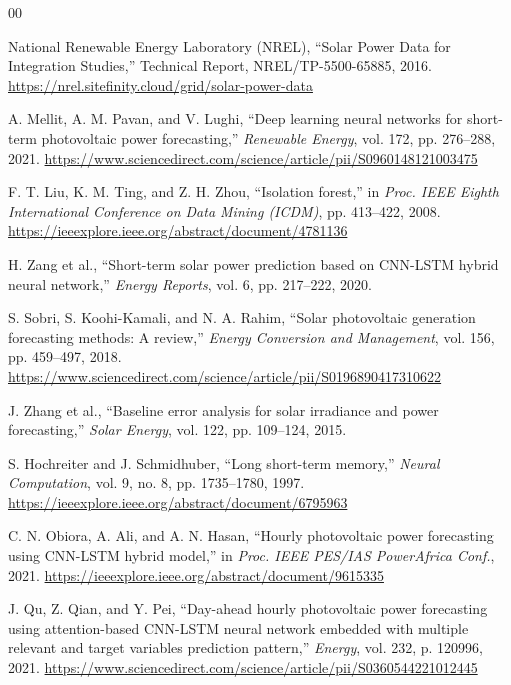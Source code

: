 \documentclass[conference]{IEEEtran}
\begin{document}
\begin{thebibliography}{00}

 National Renewable Energy Laboratory (NREL), ``Solar Power Data for Integration Studies,'' Technical Report, NREL/TP-5500-65885, 2016. \url{https://nrel.sitefinity.cloud/grid/solar-power-data}

 A. Mellit, A. M. Pavan, and V. Lughi, ``Deep learning neural networks for short-term photovoltaic power forecasting,'' \textit{Renewable Energy}, vol. 172, pp. 276--288, 2021. \url{https://www.sciencedirect.com/science/article/pii/S0960148121003475}

 F. T. Liu, K. M. Ting, and Z. H. Zhou, ``Isolation forest,'' in \textit{Proc. IEEE Eighth International Conference on Data Mining (ICDM)}, pp. 413--422, 2008. \url{https://ieeexplore.ieee.org/abstract/document/4781136}

 H. Zang et al., ``Short-term solar power prediction based on CNN-LSTM hybrid neural network,'' \textit{Energy Reports}, vol. 6, pp. 217--222, 2020.

 S. Sobri, S. Koohi-Kamali, and N. A. Rahim, ``Solar photovoltaic generation forecasting methods: A review,'' \textit{Energy Conversion and Management}, vol. 156, pp. 459--497, 2018. \url{https://www.sciencedirect.com/science/article/pii/S0196890417310622}

 J. Zhang et al., ``Baseline error analysis for solar irradiance and power forecasting,'' \textit{Solar Energy}, vol. 122, pp. 109--124, 2015.

 S. Hochreiter and J. Schmidhuber, ``Long short-term memory,'' \textit{Neural Computation}, vol. 9, no. 8, pp. 1735--1780, 1997. \url{https://ieeexplore.ieee.org/abstract/document/6795963}

 C. N. Obiora, A. Ali, and A. N. Hasan, ``Hourly photovoltaic power forecasting using CNN-LSTM hybrid model,'' in \textit{Proc. IEEE PES/IAS PowerAfrica Conf.}, 2021. \url{https://ieeexplore.ieee.org/abstract/document/9615335}

 J. Qu, Z. Qian, and Y. Pei, ``Day-ahead hourly photovoltaic power forecasting using attention-based CNN-LSTM neural network embedded with multiple relevant and target variables prediction pattern,'' \textit{Energy}, vol. 232, p. 120996, 2021. \url{https://www.sciencedirect.com/science/article/pii/S0360544221012445}


\end{thebibliography}
\end{document}
